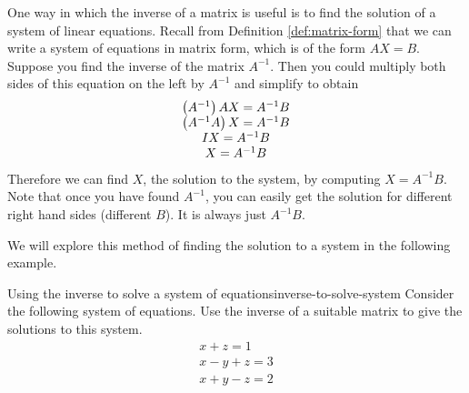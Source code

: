 One way in which the inverse of a matrix is useful is to find the
solution of a system of linear equations.  Recall from Definition
\ref{def:matrix-form} that we can write a system of equations in
matrix form, which is of the form $AX=B$. Suppose you find the inverse
of the matrix $A^{-1}$. Then you could multiply both sides of this
equation on the left by $A^{-1}$ and simplify to obtain
\begin{equation*}
  \begin{array}{c}
    \left(A^{-1} \right) AX =A^{-1}B \\
    \left(A^{-1}A\right) X = A^{-1}B \\
    IX = A^{-1}B \\
    X = A^{-1}B
  \end{array}
\end{equation*}
Therefore we can find $X$, the solution to the system, by computing
$X=A^{-1}B$.  Note that once you have found $A^{-1}$, you can easily
get the solution for different right hand sides (different $B$). It is
always just $A^{-1}B$.

We will explore this method of finding the solution to a system in the
following example.

\begin{example}{Using the inverse to solve a system of equations}{inverse-to-solve-system}
  Consider the following system of equations. Use the inverse of a
  suitable matrix to give the solutions to this system.
  \begin{equation*}
    \begin{array}{c}
      x+z=1 \\
      x-y+z=3 \\
      x+y-z=2
    \end{array}
  \end{equation*}
\end{example}

